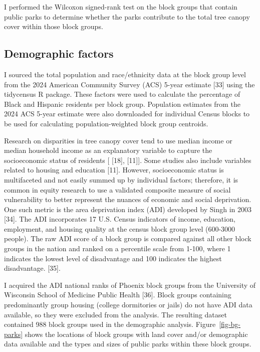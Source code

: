 \documentclass[
  sn-basic,
]{sn-jnl}
\begin{document}
I performed the Wilcoxon signed-rank test on the block groups that
contain public parks to determine whether the parks contribute to the
total tree canopy cover within those block groups.

\subsection{Demographic factors}\label{sec-demographic}

I sourced the total population and race/ethnicity data at the block
group level from the 2024 American Community Survey (ACS) 5-year
estimate {[}33{]} using the tidycensus R package. These factors were
used to calculate the percentage of Black and Hispanic residents per
block group. Population estimates from the 2024 ACS 5-year estimate were
also downloaded for individual Census blocks to be used for calculating
population-weighted block group centroids.

Research on disparities in tree canopy cover tend to use median income
or median household income as an explanatory variable to capture the
socioeconomic status of residents {[} {[}18{]}, {[}11{]}{]}. Some
studies also include variables related to housing and education
{[}11{]}. However, socioeconomic status is multifaceted and not easily
summed up by individual factors; therefore, it is common in equity
research to use a validated composite measure of social vulnerability to
better represent the nuances of economic and social deprivation. One
such metric is the area deprivation index (ADI) developed by Singh in
2003 {[}34{]}. The ADI incorporates 17 U.S. Census indicators of income,
education, employment, and housing quality at the census block group
level (600-3000 people). The raw ADI score of a block group is compared
against all other block groups in the nation and ranked on a percentile
scale from 1-100, where 1 indicates the lowest level of disadvantage and
100 indicates the highest disadvantage. {[}35{]}.

I acquired the ADI national ranks of Phoenix block groups from the
University of Wisconsin School of Medicine Public Health {[}36{]}. Block
groups containing predominantly group housing (college dormitories or
jails) do not have ADI data available, so they were excluded from the
analysis. The resulting dataset contained 988 block groups used in the
demographic analysis. Figure~\ref{fig-bg-parks} shows the locations of
block groups with land cover and/or demographic data available and the
types and sizes of public parks within these block groups.
\end{document}
